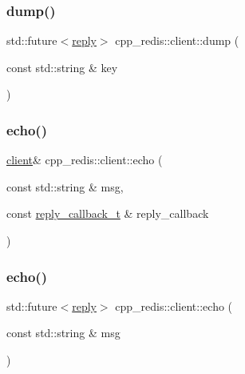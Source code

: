 \mbox{\label{classcpp__redis_1_1client_aa25f7f2648c1a013ce079ef13e8e2f0f}} 
\subsubsection{\texorpdfstring{dump()}{dump()}\hspace{0.1cm}{\footnotesize\ttfamily [2/2]}}
{\footnotesize\ttfamily std\+::future$<$\hyperlink{classcpp__redis_1_1reply}{reply}$>$ cpp\+\_\+redis\+::client\+::dump (\begin{DoxyParamCaption}\item[{const std\+::string \&}]{key }\end{DoxyParamCaption})}

\mbox{\label{classcpp__redis_1_1client_a285d35a355052ae1757d13ecec0539e8}} 
\subsubsection{\texorpdfstring{echo()}{echo()}\hspace{0.1cm}{\footnotesize\ttfamily [1/2]}}
{\footnotesize\ttfamily \hyperlink{classcpp__redis_1_1client}{client}\& cpp\+\_\+redis\+::client\+::echo (\begin{DoxyParamCaption}\item[{const std\+::string \&}]{msg,  }\item[{const \hyperlink{classcpp__redis_1_1client_a061a1140d36d2eaeda82b09a0bb3f9f2}{reply\+\_\+callback\+\_\+t} \&}]{reply\+\_\+callback }\end{DoxyParamCaption})}

\mbox{\label{classcpp__redis_1_1client_af0e3462a35f72aeae1527f0cb3cc8570}} 
\subsubsection{\texorpdfstring{echo()}{echo()}\hspace{0.1cm}{\footnotesize\ttfamily [2/2]}}
{\footnotesize\ttfamily std\+::future$<$\hyperlink{classcpp__redis_1_1reply}{reply}$>$ cpp\+\_\+redis\+::client\+::echo (\begin{DoxyParamCaption}\item[{const std\+::string \&}]{msg }\end{DoxyParamCaption})}

